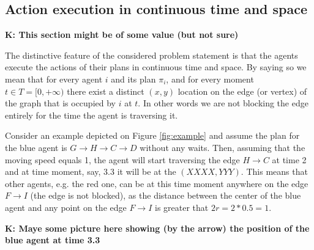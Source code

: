 

\subsection{Action execution in continuous time and space}
\textbf{K: This section might be of some value (but not sure)}

The distinctive feature of the considered problem statement is that the agents execute the actions of their plans in continuous time and space. By saying so we mean that for every agent $i$ and its plan $\pi_i$, and for every moment $t \in T=[0, +\infty)$ there exist a distinct $(x, y)$ location on the edge (or vertex) of the graph that is occupied by $i$ at $t$. In other words we are not blocking the edge entirely for the time the agent is traversing it.

Consider an example depicted on Figure \ref{fig:example} and assume the plan for the blue agent is $G \rightarrow H \rightarrow C \rightarrow D$ without any waits. Then, assuming that the moving speed equals 1, the agent will start traversing the edge $H \rightarrow C$ at time 2 and at time moment, say, $3.3$ it will be at the $(XXXX, YYY)$. This means that other agents, e.g. the red one, can be at this time moment anywhere on the edge $F \rightarrow I$ (the edge is not blocked), as the distance between the center of the blue agent and any point on the edge $F \rightarrow I$ is greater that $2r=2*0.5=1$.

\textbf{K: Maye some picture here showing (by the arrow) the position of the blue agent at time 3.3}
